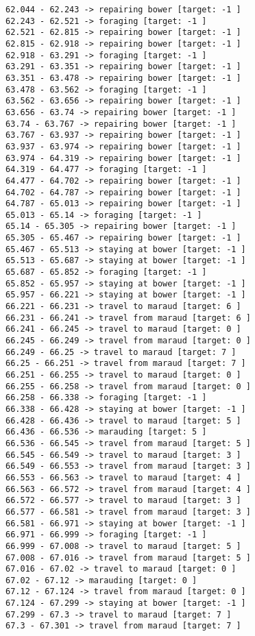 \documentclass[11pt]{article}
\begin{document}
\begin{Verbatim}[commandchars=\\\{\}]
62.044 - 62.243 -> repairing bower [target: -1 ]
62.243 - 62.521 -> foraging [target: -1 ]
62.521 - 62.815 -> repairing bower [target: -1 ]
62.815 - 62.918 -> repairing bower [target: -1 ]
62.918 - 63.291 -> foraging [target: -1 ]
63.291 - 63.351 -> repairing bower [target: -1 ]
63.351 - 63.478 -> repairing bower [target: -1 ]
63.478 - 63.562 -> foraging [target: -1 ]
63.562 - 63.656 -> repairing bower [target: -1 ]
63.656 - 63.74 -> repairing bower [target: -1 ]
63.74 - 63.767 -> repairing bower [target: -1 ]
63.767 - 63.937 -> repairing bower [target: -1 ]
63.937 - 63.974 -> repairing bower [target: -1 ]
63.974 - 64.319 -> repairing bower [target: -1 ]
64.319 - 64.477 -> foraging [target: -1 ]
64.477 - 64.702 -> repairing bower [target: -1 ]
64.702 - 64.787 -> repairing bower [target: -1 ]
64.787 - 65.013 -> repairing bower [target: -1 ]
65.013 - 65.14 -> foraging [target: -1 ]
65.14 - 65.305 -> repairing bower [target: -1 ]
65.305 - 65.467 -> repairing bower [target: -1 ]
65.467 - 65.513 -> staying at bower [target: -1 ]
65.513 - 65.687 -> staying at bower [target: -1 ]
65.687 - 65.852 -> foraging [target: -1 ]
65.852 - 65.957 -> staying at bower [target: -1 ]
65.957 - 66.221 -> staying at bower [target: -1 ]
66.221 - 66.231 -> travel to maraud [target: 6 ]
66.231 - 66.241 -> travel from maraud [target: 6 ]
66.241 - 66.245 -> travel to maraud [target: 0 ]
66.245 - 66.249 -> travel from maraud [target: 0 ]
66.249 - 66.25 -> travel to maraud [target: 7 ]
66.25 - 66.251 -> travel from maraud [target: 7 ]
66.251 - 66.255 -> travel to maraud [target: 0 ]
66.255 - 66.258 -> travel from maraud [target: 0 ]
66.258 - 66.338 -> foraging [target: -1 ]
66.338 - 66.428 -> staying at bower [target: -1 ]
66.428 - 66.436 -> travel to maraud [target: 5 ]
66.436 - 66.536 -> marauding [target: 5 ]
66.536 - 66.545 -> travel from maraud [target: 5 ]
66.545 - 66.549 -> travel to maraud [target: 3 ]
66.549 - 66.553 -> travel from maraud [target: 3 ]
66.553 - 66.563 -> travel to maraud [target: 4 ]
66.563 - 66.572 -> travel from maraud [target: 4 ]
66.572 - 66.577 -> travel to maraud [target: 3 ]
66.577 - 66.581 -> travel from maraud [target: 3 ]
66.581 - 66.971 -> staying at bower [target: -1 ]
66.971 - 66.999 -> foraging [target: -1 ]
66.999 - 67.008 -> travel to maraud [target: 5 ]
67.008 - 67.016 -> travel from maraud [target: 5 ]
67.016 - 67.02 -> travel to maraud [target: 0 ]
67.02 - 67.12 -> marauding [target: 0 ]
67.12 - 67.124 -> travel from maraud [target: 0 ]
67.124 - 67.299 -> staying at bower [target: -1 ]
67.299 - 67.3 -> travel to maraud [target: 7 ]
67.3 - 67.301 -> travel from maraud [target: 7 ]

\end{Verbatim}
\end{document}
